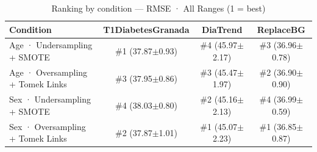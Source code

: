 \begin{table}[htbp]
\centering
\small
\caption{Ranking by condition — RMSE · All Ranges  (1 = best)}
\label{tab:ranking_rmse_entire_family_mechanism_random+guided}
\begin{tabular}{lccc}
\toprule
\textbf{Condition} & \textbf{T1DiabetesGranada} & \textbf{DiaTrend} & \textbf{ReplaceBG} \\
\midrule
Age · Undersampling + SMOTE & \#1 (37.87$\pm$0.93) & \#4 (45.97$\pm$2.17) & \#3 (36.96$\pm$0.78) \\
Age · Oversampling + Tomek Links & \#3 (37.95$\pm$0.86) & \#3 (45.47$\pm$1.97) & \#2 (36.90$\pm$0.90) \\
\midrule
Sex · Undersampling + SMOTE & \#4 (38.03$\pm$0.80) & \#2 (45.16$\pm$2.13) & \#4 (36.99$\pm$0.59) \\
Sex · Oversampling + Tomek Links & \#2 (37.87$\pm$1.01) & \#1 (45.07$\pm$2.23) & \#1 (36.85$\pm$0.87) \\
\bottomrule
\end{tabular}
\end{table}